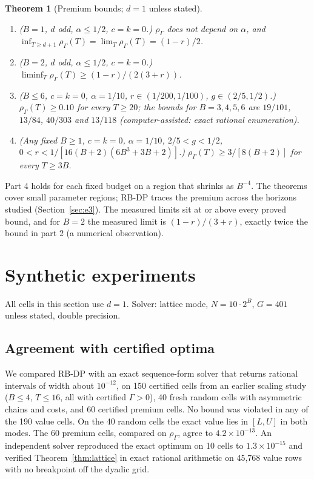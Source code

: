 \documentclass{article}
\theoremstyle{plain}
\newtheorem{theorem}{Theorem}
\theoremstyle{definition}
\theoremstyle{remark}
\newcommand{\rhoG}{\rho_\Gamma}
\begin{document}
\begin{theorem}[Premium bounds; $d=1$ unless stated]
\label{thm:premium}
\begin{enumerate}
\item ($B=1$, $d$ odd, $\alpha\le1/2$, $c=k=0$.) $\rhoG$ does not depend on $\alpha$, and $\inf_{T\ge d+1}\rhoG(T)=\lim_T\rhoG(T)=(1-r)/2$.
\item ($B=2$, $d$ odd, $\alpha\le 1/2$, $c=k=0$.) $\liminf_T\rhoG(T)\ge(1-r)/(2(3+r))$.
\item ($B\le 6$, $c=k=0$, $\alpha=1/10$, $r\in(1/200,1/100)$, $g\in(2/5,1/2)$.) $\rhoG(T)\ge 0.10$ for every $T\ge 20$; the bounds for $B=3,4,5,6$ are $19/101$, $13/84$, $40/303$ and $13/118$ (computer-assisted: exact rational enumeration).
\item (Any fixed $B\ge 1$, $c=k=0$, $\alpha=1/10$, $2/5<g<1/2$, $0<r<1/[16(B+2)(6B^3+3B+2)]$.) $\rhoG(T)\ge 3/[8(B+2)]$ for every $T\ge 3B$.
\end{enumerate}
\end{theorem}

Part 4 holds for each fixed budget on a region that shrinks as $B^{-4}$. The theorems cover small parameter regions; RB-DP traces the premium across the horizons studied (Section~\ref{sec:e3}). The measured limits sit at or above every proved bound, and for $B=2$ the measured limit is $(1-r)/(3+r)$, exactly twice the bound in part 2 (a numerical observation).

\section{Synthetic experiments}
\label{sec:synthetic}

All cells in this section use $d=1$. Solver: lattice mode, $N=10\cdot2^B$, $G=401$ unless stated, double precision.

\subsection{Agreement with certified optima}
\label{sec:e1}

We compared RB-DP with an exact sequence-form solver that returns rational intervals of width about $10^{-12}$, on 150 certified cells from an earlier scaling study ($B\le4$, $T\le16$, all with certified $\Gamma>0$), 40 fresh random cells with asymmetric chains and costs, and 60 certified premium cells. No bound was violated in any of the 190 value cells. On the 40 random cells the exact value lies in $[L,U]$ in both modes. The 60 premium cells, compared on $\rhoG$, agree to $4.2\times10^{-13}$. An independent solver reproduced the exact optimum on 10 cells to $1.3\times10^{-15}$ and verified Theorem~\ref{thm:lattice} in exact rational arithmetic on 45{,}768 value rows with no breakpoint off the dyadic grid.
\end{document}
